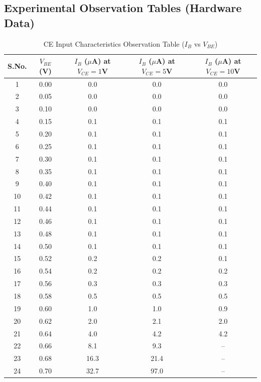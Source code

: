 \documentclass[11pt,a4paper]{article}
\begin{document}
\subsection{Experimental Observation Tables (Hardware Data)}

\begin{longtable}{c c c c c}
\caption{CE Input Characteristics Observation Table ($I_B$ vs $V_{BE}$)}\label{tab:ce_input_readings}\\
\toprule
\textbf{S.No.} & \textbf{$V_{BE}$ (V)} & \textbf{$I_B$ ($\mu$A) at $V_{CE}=1$V} & \textbf{$I_B$ ($\mu$A) at $V_{CE}=5$V} & \textbf{$I_B$ ($\mu$A) at $V_{CE}=10$V} \\
\midrule
\endhead
1 & 0.00 & 0.0 & 0.0 & 0.0 \\
2 & 0.05 & 0.0 & 0.0 & 0.0 \\
3 & 0.10 & 0.0 & 0.0 & 0.0 \\
4 & 0.15 & 0.1 & 0.1 & 0.1 \\
5 & 0.20 & 0.1 & 0.1 & 0.1 \\
6 & 0.25 & 0.1 & 0.1 & 0.1 \\
7 & 0.30 & 0.1 & 0.1 & 0.1 \\
8 & 0.35 & 0.1 & 0.1 & 0.1 \\
9 & 0.40 & 0.1 & 0.1 & 0.1 \\
10 & 0.42 & 0.1 & 0.1 & 0.1 \\
11 & 0.44 & 0.1 & 0.1 & 0.1 \\
12 & 0.46 & 0.1 & 0.1 & 0.1 \\
13 & 0.48 & 0.1 & 0.1 & 0.1 \\
14 & 0.50 & 0.1 & 0.1 & 0.1 \\
15 & 0.52 & 0.2 & 0.2 & 0.1 \\
16 & 0.54 & 0.2 & 0.2 & 0.2 \\
17 & 0.56 & 0.3 & 0.3 & 0.3 \\
18 & 0.58 & 0.5 & 0.5 & 0.5 \\
19 & 0.60 & 1.0 & 1.0 & 0.9 \\
20 & 0.62 & 2.0 & 2.1 & 2.0 \\
21 & 0.64 & 4.0 & 4.2 & 4.2 \\
22 & 0.66 & 8.1 & 9.3 & -- \\
23 & 0.68 & 16.3 & 21.4 & -- \\
24 & 0.70 & 32.7 & 97.0 & -- \\
\bottomrule
\end{longtable}
\end{document}

